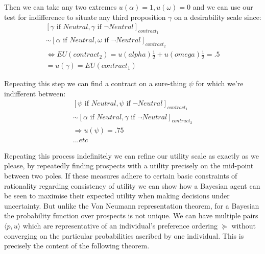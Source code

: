 \documentclass{tufte-handout}
\begin{document}
\noindent Then we can take any two extremes $u(\alpha) = 1, u(\omega) = 0$ and we can use our test for indifference to situate any third proposition $\gamma$ on a desirability scale since: 
\begin{equation} 
\begin{split}
 [\gamma \text{ if } Neutral, \gamma \text{ if } \neg Neutral]_{contract_1} \\ 
 \sim   [\alpha \text{ if } Neutral, \omega \text{ if } \neg Neutral ]_{contract_2} \\
 \Leftrightarrow EU(contract_{2}) = u(alpha)\frac{1}{2}  + u(omega)\frac{1}{2} = .5  \\ = u(\gamma) = EU(contract_{1})
\end{split}
\end{equation}

Repeating this step we can find a contract on a sure-thing $\psi$ for which we're indifferent between:
\begin{equation} 
\begin{split}
[\psi \text{ if } Neutral, \psi \text{ if } \neg Neutral]_{contract_1}  \\
 \sim   [\alpha \text{ if } Neutral, \gamma \text{ if } \neg Neutral ]_{contract_2} \\
  \Rightarrow u(\psi) = .75
   \\ . . . etc
 \end{split}
\end{equation}


Repeating this process indefinitely we can refine our utility scale as exactly as we please, by repeatedly finding prospects with a utility precisely  on the mid-point between two poles. If these measures adhere to certain basic constraints of rationality regarding consistency of utility we can show how a Bayesian agent can be seen to maximise their expected utility when making decisions under uncertainty. But unlike the Von Neumann representation theorem, for a Bayesian the probability function over prospects is not unique. We can have multiple pairs $\langle p, u \rangle$ which are representative of an individual's preference ordering $\succeq$ without converging on the particular probabilities ascribed by one individual. This is precisely the content of the following theorem. 
\end{document}
